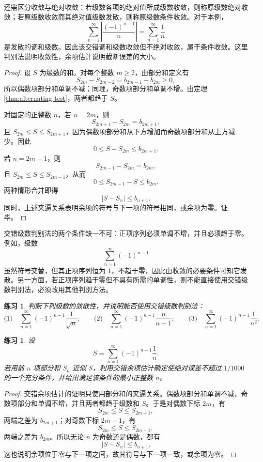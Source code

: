 \documentclass[UTF8,fontset=fandol,11pt]{ctexart}
\newtheorem{exercise}[definition]{练习}
\begin{document}
还需区分收敛与绝对收敛：若级数各项的绝对值所成级数收敛，则称原级数绝对收敛；若原级数收敛而其绝对值级数发散，则称原级数条件收敛。对于本例，
\[
\sum_{n=1}^{\infty}\left|\frac{(-1)^{n-1}}{n}\right|=\sum_{n=1}^{\infty}\frac1n
\]
是发散的调和级数。因此该交错调和级数收敛但不绝对收敛，属于条件收敛。这里判别法说明收敛性，余项估计说明截断误差的大小。\par
\begin{proof}
设 $S$ 为级数的和。对每个整数 $m\geq2$，由部分和定义有
\[
S_{2m}-S_{2m-2}=b_{2m-1}-b_{2m}\geq0,
\]
所以偶数项部分和单调不减；同理，奇数项部分和单调不增。由定理 \ref{thm:alternating-test}，两者都趋于 $S$。

对固定的正整数 $n$，若 $n=2m$，则
\[
S_{2m+1}-S_{2m}=b_{2m+1},
\]
且 $S_{2m}\leq S\leq S_{2m+1}$，因为偶数项部分和从下方增加而奇数项部分和从上方减少。因此
\[
0\leq S-S_{2m}\leq b_{2m+1}.
\]
若 $n=2m-1$，则
\[
S_{2m-1}-S_{2m} = b_{2m},
\]
且 $S_{2m}\leq S\leq S_{2m-1}$，从而
\[
0\leq S_{2m-1}-S\leq b_{2m}.
\]
两种情形合并即得
\[
|S-S_n|\leq b_{n+1}.
\]
同时，上述夹逼关系表明余项的符号与下一项的符号相同，或余项为零。证毕。
\end{proof}
交错级数判别法的两个条件缺一不可：正项序列必须单调不增，并且必须趋于零。例如，级数
\[
\sum_{n=1}^{\infty}(-1)^{n-1}
\]
虽然符号交替，但其正项序列恒为 $1$，不趋于零，因此由收敛的必要条件可知它发散。另一方面，若正项序列趋于零但不具有所需的单调性，则不能直接使用交错级数判别法，必须改用其他判别方法。\par
\begin{exercise}
\label{mathagent:exercise:3095db2dc0f723686b84b8afdd22af197f8af13ce063f1be09f10d01d7c714d4}
判断下列级数的敛散性，并说明能否使用交错级数判别法：
\[
\text{(1)}\quad \sum_{n=1}^{\infty}(-1)^{n-1}\frac{1}{\sqrt n};
\qquad
\text{(2)}\quad \sum_{n=1}^{\infty}(-1)^{n-1}\frac{n}{n+1};
\qquad
\text{(3)}\quad \sum_{n=1}^{\infty}(-1)^{n-1}\frac{1}{n^2}.
\]
\end{exercise}
\begin{exercise}
\label{mathagent:exercise:37f834f54379aebf7e4baa24deeb349383425717b5a35fbdf307b6e732190871}
设
\[
S=\sum_{n=1}^{\infty}(-1)^{n-1}\frac{1}{n}.
\]
若用前 $n$ 项部分和 $S_n$ 近似 $S$，利用交错余项估计确定使绝对误差不超过 $1/1000$ 的一个充分条件，并给出满足该条件的最小正整数 $n$。
\end{exercise}
\begin{proof}
交错余项估计的证明只使用部分和的夹逼关系。偶数项部分和单调不减，奇数项部分和单调不增，并且两者都趋于级数和 $S$。于是对偶数下标 $2m$，有
\[
S_{2m}\leq S\leq S_{2m+1},
\]
两端之差为 $b_{2m+1}$；对奇数下标 $2m-1$，有
\[
S_{2m}\leq S\leq S_{2m-1},
\]
两端之差为 $b_{2m}$。所以无论 $n$ 为奇数还是偶数，都有
\[
|S-S_n|\leq b_{n+1}.
\]
这也说明余项位于零与下一项之间，故其符号与下一项一致，或余项为零。
\end{proof}
\end{document}
